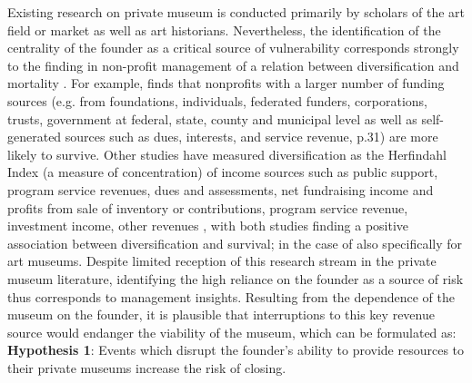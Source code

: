 \documentclass[12pt]{article}
\begin{document}
Existing research on private museum is conducted primarily by scholars of the art field or market as well as art historians.
Nevertheless, the identification of the centrality of the founder as a critical source of vulnerability corresponds strongly to the finding in non-profit management of a relation between diversification and mortality \parencite{Tuckman_Chang_1991_vulnerability,Hung_Hager_2018_diversification}.
For example, \textcite{Bielefeld_1994_survival} finds that nonprofits with a larger number of funding sources (e.g. from foundations, individuals, federated funders, corporations, trusts, government at federal, state, county and municipal level as well as self-generated sources such as dues, interests, and service revenue, p.31) are more likely to survive.
Other studies have measured diversification as the Herfindahl Index (a measure of concentration) of income sources such as public support, program service revenues, dues and assessments, net fundraising income and profits from sale of inventory \parencite[p.381]{Hager_2001_vulnerability} or contributions, program service revenue, investment income, other revenues \parencite[p.37]{Lu_Shon_Zhang_2019_dissolution}, with both studies finding a positive association between diversification and survival; in the case of \textcite{Hager_2001_vulnerability} also specifically for art museums.
Despite limited reception of this research stream in the private museum literature, identifying the high reliance on the founder as a source of risk thus corresponds to management insights. 
Resulting from the dependence of the museum on the founder, it is plausible that interruptions to this key revenue source would endanger the viability of the museum, which can be formulated as: 
\bigbreak
\noindent
\textbf{Hypothesis 1}: Events which disrupt the founder's ability to provide resources to their private museums increase the risk of closing. 
\end{document}
